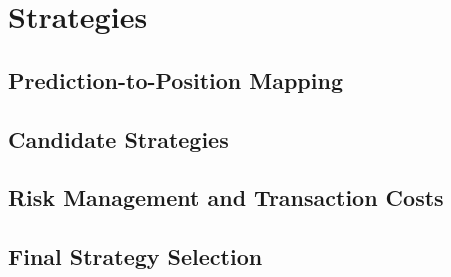 \section{Strategies}

\subsection{Prediction-to-Position Mapping}

\subsection{Candidate Strategies}

\subsection{Risk Management and Transaction Costs}

\subsection{Final Strategy Selection}